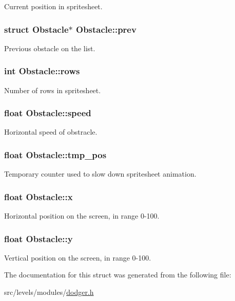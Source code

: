 Current position in spritesheet. \hypertarget{structObstacle_a13bc07b730f58d5b1c3db68e8e4aca27}{
\subsubsection[{prev}]{\setlength{\rightskip}{0pt plus 5cm}struct {\bf Obstacle}$\ast$ Obstacle\+::prev}}\label{structObstacle_a13bc07b730f58d5b1c3db68e8e4aca27}
Previous obstacle on the list. \hypertarget{structObstacle_aab33c9d4c0f05d02fda4e77cff7d7e72}{
\subsubsection[{rows}]{\setlength{\rightskip}{0pt plus 5cm}int Obstacle\+::rows}}\label{structObstacle_aab33c9d4c0f05d02fda4e77cff7d7e72}
Number of rows in spritesheet. \hypertarget{structObstacle_a1e2b46db05325273ce0fcba3550b5b2a}{
\subsubsection[{speed}]{\setlength{\rightskip}{0pt plus 5cm}float Obstacle\+::speed}}\label{structObstacle_a1e2b46db05325273ce0fcba3550b5b2a}
Horizontal speed of obstracle. \hypertarget{structObstacle_afd620c4c3496cd6f84184dcda4ca7611}{
\subsubsection[{tmp\+\_\+pos}]{\setlength{\rightskip}{0pt plus 5cm}float Obstacle\+::tmp\+\_\+pos}}\label{structObstacle_afd620c4c3496cd6f84184dcda4ca7611}
Temporary counter used to slow down spritesheet animation. \hypertarget{structObstacle_ad9cd25e0032f6692a4f93a057ccdfd85}{
\subsubsection[{x}]{\setlength{\rightskip}{0pt plus 5cm}float Obstacle\+::x}}\label{structObstacle_ad9cd25e0032f6692a4f93a057ccdfd85}
Horizontal position on the screen, in range 0-\/100. \hypertarget{structObstacle_af4b6f012014e2fa5aef193330f70fdef}{
\subsubsection[{y}]{\setlength{\rightskip}{0pt plus 5cm}float Obstacle\+::y}}\label{structObstacle_af4b6f012014e2fa5aef193330f70fdef}
Vertical position on the screen, in range 0-\/100. 

The documentation for this struct was generated from the following file\+:\begin{DoxyCompactItemize}
\item 
src/levels/modules/\hyperlink{dodger_8h}{dodger.\+h}\end{DoxyCompactItemize}
